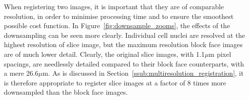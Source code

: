 	 When registering two images, it is important that they are of comparable resolution, in order to minimise processing time and to ensure the smoothest possible cost function. In Figure~\ref{fig:downsample_zooms}, the effects of the downsampling can be seen more clearly. Individual cell nuclei are resolved at the highest resolution of slice image, but the maximum resolution block face images are of much lower detail. Clearly, the original slice images, with 1.1$\mu$m pixel spacings, are needlessly detailed compared to their block face counterparts, with a mere 26.6$\mu$m. As is discussed in Section~\ref{ssub:multiresolution_registration}, it is therefore appropriate to register slice images at a factor of 8 times more downsampled than the block face images.
    
    \begin{figure}
      \centering

\end{figure}
